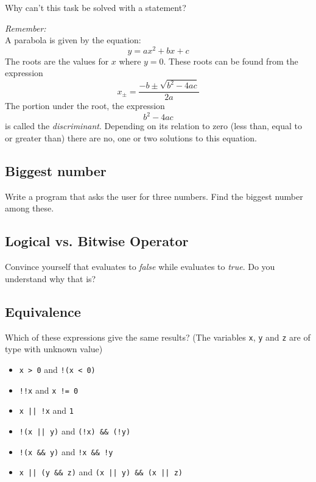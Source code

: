 Why can't this task be solved with a  statement?

\emph{Remember:}\\
A parabola is given by the equation:
\[ y = ax^2 + bx + c \]
The roots are the values for $x$ where $y = 0$. These roots can be found from the expression
\[ x_{\pm} = \dfrac{-b \pm \sqrt{b^2 - 4ac}}{2a} \]
The portion under the root, \ie the expression
\[ b^2 - 4ac \]
is called the \emph{discriminant}. Depending on its relation to zero (less than, equal to or greater than) there are no, one or two solutions to this equation.

\subsection*{Biggest number}
Write a program that asks the user for three numbers. Find the biggest number among these.

\subsection*{Logical vs. Bitwise Operator}
Convince yourself that  evaluates to \emph{false} while  evaluates to \emph{true}. Do you understand why that is?

\subsection*{Equivalence}
Which of these expressions give the same results? (The variables \texttt{x}, \texttt{y} and \texttt{z} are of type  with unknown value)
\begin{itemize}
\item \texttt{x > 0} and \texttt{!(x < 0)}
\item \texttt{!!x} and \texttt{x != 0}
\item \texttt{x || !x} and \texttt{1}
\item \texttt{!(x || y)} and \texttt{(!x) \&\& (!y)}
\item \texttt{!(x \&\& y)} and \texttt{!x \&\& !y}
\item \texttt{x || (y \&\& z)} and \texttt{(x || y) \&\& (x || z)}
\end{itemize}
\vfill

